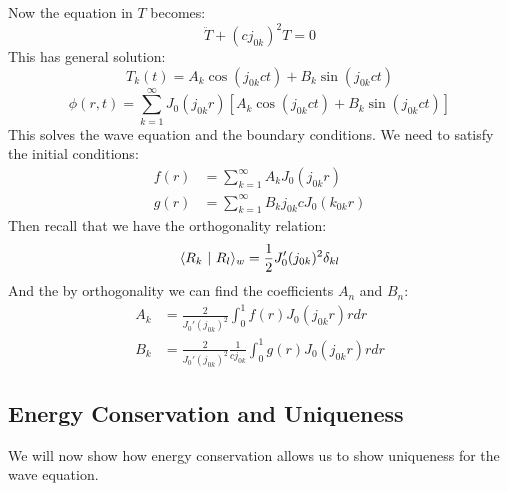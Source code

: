 \documentclass[../Main.tex]{subfiles}
\begin{document}
Now the equation in $T$ becomes:
\begin{equation*}
    \ddot{T} + (cj_{0k})^2 T = 0
\end{equation*}
This has general solution:
\begin{equation*}
    T_k(t) = A_k \cos(j_{0k}ct) + B_k \sin(j_{0k}ct)
\end{equation*}
\begin{equation}
    \phi(r, t) = \sum_{k=1}^{\infty} J_0(j_{0k}r) \left[A_k \cos(j_{0k}ct) + B_k \sin(j_{0k}ct)\right]
    \label{eqnWaveDrumSoln}
\end{equation}
This solves the wave equation and the boundary conditions. We need to satisfy the initial conditions:
\begin{align*}
    f(r) &= \sum_{k=1}^{\infty} A_k J_0(j_{0k}r) \\
    g(r) &= \sum_{k=1}^{\infty} B_k j_{0k} c J_0(k_{0k}r)
\end{align*}
Then recall that we have the orthogonality relation:
\begin{equation*}
    \langle R_k~\vert~R_l\rangle_w = \frac12 J_0'(j_{0k})^2 \delta_{kl}
\end{equation*}
And the by orthogonality we can find the coefficients $A_n$ and $B_n$:
\begin{align*}
    A_k &= \frac{2}{J_0'(j_{0k})^2} \int_{0}^{1} f(r) J_0(j_{0k}r) r dr \\
    B_k &= \frac{2}{J_0'(j_{0k})^2} \frac{1}{cj_{0k}} \int_{0}^{1} g(r) J_0(j_{0k}r)r dr
\end{align*}
\subsection{Energy Conservation and Uniqueness}
We will now show how energy conservation allows us to show uniqueness for the wave equation.
\end{document}
